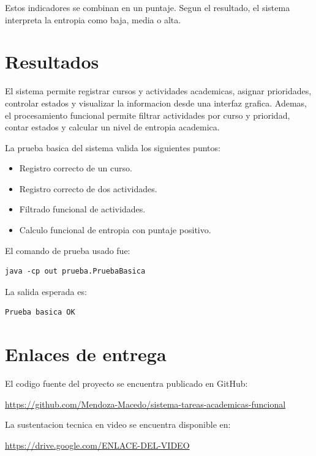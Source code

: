 \documentclass[12pt]{article}
\newcommand{\repositorioGithub}{https://github.com/Mendoza-Macedo/sistema-tareas-academicas-funcional}
\newcommand{\videoSustentacion}{https://drive.google.com/ENLACE-DEL-VIDEO}
\begin{document}
Estos indicadores se combinan en un puntaje. Segun el resultado, el sistema interpreta la entropia como baja, media o alta.

\section{Resultados}

El sistema permite registrar cursos y actividades academicas, asignar prioridades, controlar estados y visualizar la informacion desde una interfaz grafica. Ademas, el procesamiento funcional permite filtrar actividades por curso y prioridad, contar estados y calcular un nivel de entropia academica.

La prueba basica del sistema valida los siguientes puntos:

\begin{itemize}
    \item Registro correcto de un curso.
    \item Registro correcto de dos actividades.
    \item Filtrado funcional de actividades.
    \item Calculo funcional de entropia con puntaje positivo.
\end{itemize}

El comando de prueba usado fue:

\begin{lstlisting}
java -cp out prueba.PruebaBasica
\end{lstlisting}

La salida esperada es:

\begin{lstlisting}
Prueba basica OK
\end{lstlisting}

\section{Enlaces de entrega}

El codigo fuente del proyecto se encuentra publicado en GitHub:

\begin{center}
    \url{\repositorioGithub}
\end{center}

La sustentacion tecnica en video se encuentra disponible en:

\begin{center}
    \url{\videoSustentacion}
\end{center}
\end{document}
